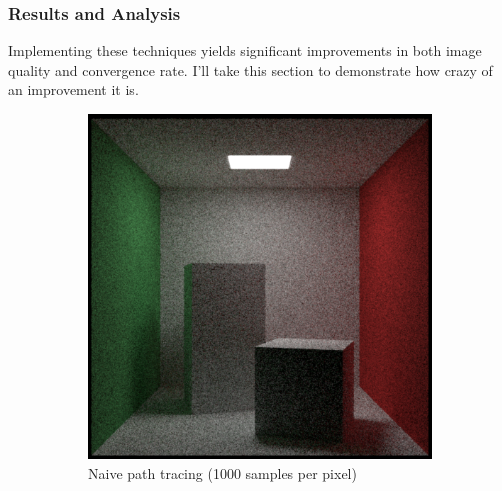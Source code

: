 \documentclass[12pt]{article}
\begin{document}
\subsubsection{Results and Analysis}

Implementing these techniques yields significant improvements in both image quality and convergence rate. I'll take this section to demonstrate how crazy of an improvement it is.

\begin{figure}[H]
    \centering
    \begin{subfigure}[b]{0.45\textwidth}
        \centering
        \includegraphics[width=\textwidth]{images/noisy_cornell.png}
        \caption{Naive path tracing (1000 samples per pixel)}
        \label{fig:naive_sampling}
    \end{subfigure}
    \hfill
    \begin{subfigure}[b]{0.45\textwidth}
        \centering

\end{subfigure}
\end{figure}
\end{document}
